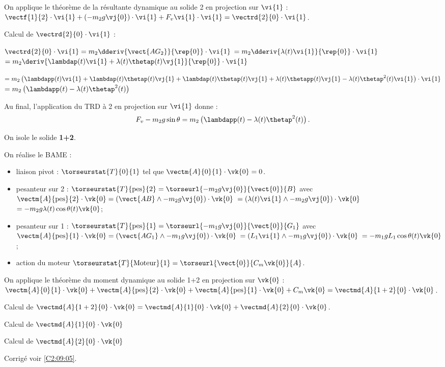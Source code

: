 On applique le théorème de la résultante dynamique au solide 2 en projection sur $\vi{1}$ :
$\vectf{1}{2}\cdot\vi{1} + \left(-m_2 g \vj{0}\right) \cdot \vi{1} + F_v \vi{1}\cdot \vi{1} = \vectrd{2}{0}\cdot \vi{1}$.

Calcul de $\vectrd{2}{0}\cdot \vi{1}$ : 

$\vectrd{2}{0}\cdot \vi{1} = m_2\dderiv{\vect{AG_2}}{\rep{0}} \cdot \vi{1}$
$= m_2 \dderiv{\lambda(t) \vi{1} }{\rep{0}} \cdot \vi{1}$
$= m_2 \deriv{\lambdap(t) \vi{1} + \lambda(t) \thetap(t)\vj{1} }{\rep{0}} \cdot \vi{1}$

$= m_2 \left(\lambdapp(t) \vi{1} + \lambdap(t) \thetap(t)\vj{1} + \lambdap(t) \thetap(t)\vj{1}
+ \lambda(t) \thetapp(t)\vj{1}- \lambda(t) \thetap^2(t)\vi{1} \right) \cdot \vi{1}$
$= m_2 \left(\lambdapp(t)   - \lambda(t) \thetap^2(t) \right)$

Au final, l'application du TRD à 2 en projection sur $\vi{1}$ donne : 
$$ F_v-m_2 g\sin \theta = m_2 \left(\lambdapp(t)   - \lambda(t) \thetap^2(t) \right).$$
\else
\fi

\ifprof
On isole le solide \textbf{1+2}.

On réalise le BAME : 
\begin{itemize}
\item liaison pivot : $\torseurstat{T}{0}{1}$ tel que $\vectm{A}{0}{1}\cdot\vk{0} = 0$.
\item pesanteur sur 2 : $\torseurstat{T}{\text{pes}}{2} = \torseurl{-m_2 g \vj{0}}{\vect{0}}{B}$ avec 
$\vectm{A}{\text{pes}}{2} \cdot \vk{0} = \left(\vect{AB}\wedge -m_2 g \vj{0} \right)\cdot \vk{0}$
$= \left(\lambda(t) \vi{1} \wedge -m_2 g \vj{0} \right)\cdot \vk{0}$
$= -m_2 g\lambda(t)\cos\theta(t) \vk{0}$;

\item pesanteur sur 1 : $\torseurstat{T}{\text{pes}}{1} = \torseurl{-m_1 g \vj{0}}{\vect{0}}{G_1}$ avec 
$\vectm{A}{\text{pes}}{1} \cdot \vk{0} = \left(\vect{AG_1}\wedge -m_1 g \vj{0} \right)\cdot \vk{0}$
$= \left(L_1 \vi{1}\wedge -m_1 g \vj{0} \right)\cdot \vk{0}$
$= -m_1 gL_1\cos\theta(t) \vk{0}$;

\item action du moteur $\torseurstat{T}{\text{Moteur}}{1} =  \torseurl{\vect{0}}{C_m \vk{0}}{A}$.
\end{itemize}

On applique le théorème du moment dynamique au solide 1+2 en projection sur $\vk{0}$ :
$
\vectm{A}{0}{1}\cdot\vk{0} 
+ \vectm{A}{\text{pes}}{2} \cdot \vk{0}
+ \vectm{A}{\text{pes}}{1} \cdot \vk{0} + C_m \vk{0}
= \vectmd{A}{1+2}{0} \cdot \vk{0}$.

Calcul de $\vectmd{A}{1+2}{0} \cdot \vk{0} = \vectmd{A}{1}{0} \cdot \vk{0} + \vectmd{A}{2}{0} \cdot \vk{0} $.

Calcul de $\vectmd{A}{1}{0} \cdot \vk{0}$

Calcul de $\vectmd{A}{2}{0} \cdot \vk{0}$

\else
\fi


\ifprof
\else
\begin{flushright}
\footnotesize{Corrigé  voir \ref{C2:09:05}.}
\end{flushright}%
\fi